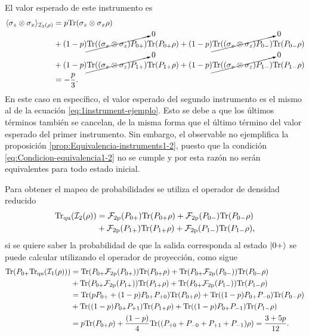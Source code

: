    El valor esperado de este instrumento es \begin{equation}\begin{split}
        \langle \sigma_z\otimes \sigma_x \rangle_{\mathcal{I}_2(\rho)}&=p{\rm Tr}(\sigma_z\otimes \sigma_x\rho)\\
       &+{(1-p)\cancelto{0}{{\rm Tr}( (\sigma_x\otimes \sigma_z)P_{0+})}}{\rm Tr}(P_{0+} \rho)+(1-p)\cancelto{0}{{\rm Tr}( (\sigma_x\otimes \sigma_z)P_{0-})}{\rm Tr}(P_{0-} \rho)\\
        &+(1-p)\cancelto{0}{{\rm Tr}( (\sigma_x\otimes \sigma_z)P_{1+})}{\rm Tr}(P_{1+} \rho)+(1-p)\cancelto{0}{{\rm Tr}( (\sigma_x\otimes \sigma_z)P_{1-})}{\rm Tr}(P_{1-} \rho)\\
        &=-\dfrac{p}{3}.
    \end{split}\end{equation} En este caso en específico, el valor esperado del segundo instrumento es el mismo al de la ecuación {\eqref{eq:1instrument-ejemplo}}. Esto se debe a que los últimos términos también se cancelan, de la misma forma que el último término del valor esperado del primer instrumento. Sin embargo, el observable no ejemplifica la proposición {\ref{prop:Equivalencia-instruments1-2}}, puesto que la condición {\eqref{eq:Condicion-equivalencia1-2}} no se cumple y por esta razón no serán equivalentes para todo estado inicial.

   Para obtener el mapeo de probabilidades se utiliza el operador de densidad reducido
\[\begin{split}{\rm Tr}_{\text{qu}}(\mathcal{I}_2(\rho))&=\mathcal{F}_{2\text{p}}(P_{0+}){\rm Tr}(P_{0+}\rho)+\mathcal{F}_{2\text{p}}(P_{0-}){\rm Tr}(P_{0-}\rho )\\&+ \mathcal{F}_{2\text{p}}({P_{1+}}){\rm Tr}( P_{1+}\rho)+\mathcal{F}_{2\text{p}}(P_{1-}){\rm Tr}(P_{1-}\rho), \\\end{split}\] 
si se quiere saber la probabilidad de que la salida corresponda al estado $|0+\rangle$ se puede calcular utilizando el operador de proyección, como sigue   \[\begin{split}
        {\rm Tr}(P_{0+}{\rm Tr}_{\text{qu}}(\mathcal{I}_1(\rho)))&={\rm Tr}(P_{0+}\mathcal{F}_{2\text{p}}(P_{0+})){\rm Tr}(P_{0+}\rho)+{\rm Tr}(P_{0+}\mathcal{F}_{2\text{p}}(P_{0-})){\rm Tr}(P_{0-}\rho )\\
        &+{\rm Tr}(P_{0+} \mathcal{F}_{2\text{p}}({P_{1+}})){\rm Tr}( P_{1+}\rho)+{\rm Tr}(P_{0+}\mathcal{F}_{2\text{p}}(P_{1-})){\rm Tr}(P_{1-}\rho)\\
        &={\rm Tr}(pP_{0+}+(1-p)P_{0+}P_{+0}){\rm Tr}(P_{0+}\rho)+{\rm Tr}((1-p)P_{0+}P_{-0}){\rm Tr}(P_{0-}\rho )\\
        &+{\rm Tr}((1-p)P_{0+} P_{+1}){\rm Tr}( P_{1+}\rho)+{\rm Tr}((1-p)P_{0+}P_{-1}){\rm Tr}(P_{1-}\rho)\\
        &=p{\rm Tr}(P_{0+}\rho)+\frac{(1-p)}{4}{\rm Tr}((P_{+0}+P_{-0}+P_{+1}+P_{-1})\rho)=\frac{3+5p}{12}.
    \end{split}\]







